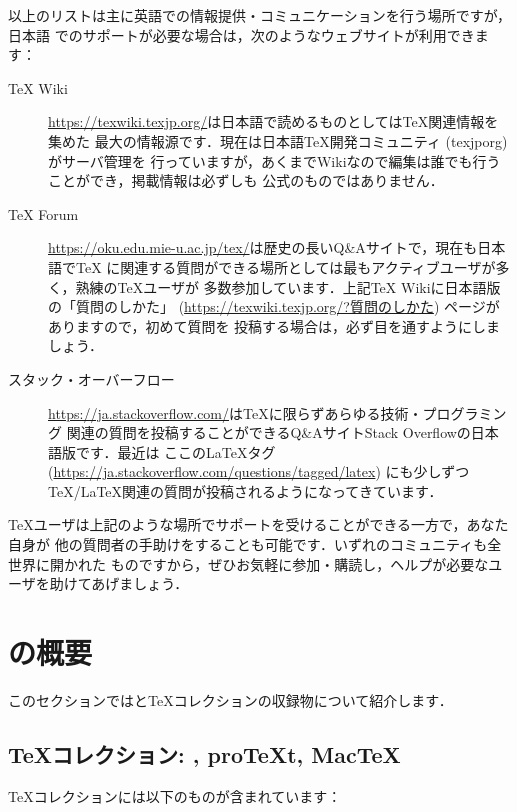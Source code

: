 \documentclass[uplatex,dvipdfmx]{jsarticle}
\begin{document}
%
以上のリストは主に英語での情報提供・コミュニケーションを行う場所ですが，日本語
でのサポートが必要な場合は，次のようなウェブサイトが利用できます：
%
\begin{description}
\item[{\TeX} Wiki]
\url{https://texwiki.texjp.org/}は日本語で読めるものとしては\TeX 関連情報を集めた
最大の情報源です．現在は日本語\TeX 開発コミュニティ (texjporg) がサーバ管理を
行っていますが，あくまでWikiなので編集は誰でも行うことができ，掲載情報は必ずしも
公式のものではありません．

\item[{\TeX} Forum]
\url{https://oku.edu.mie-u.ac.jp/tex/}は歴史の長いQ\&Aサイトで，現在も日本語で\TeX
に関連する質問ができる場所としては最もアクティブユーザが多く，熟練の\TeX ユーザが
多数参加しています．上記{\TeX} Wikiに日本語版の「質問のしかた」
(\url{https://texwiki.texjp.org/?質問のしかた}) ページがありますので，初めて質問を
投稿する場合は，必ず目を通すようにしましょう．

\item[スタック・オーバーフロー]
\url{https://ja.stackoverflow.com/}は\TeX に限らずあらゆる技術・プログラミング
関連の質問を投稿することができるQ\&AサイトStack Overflowの日本語版です．最近は
ここの\LaTeX タグ (\url{https://ja.stackoverflow.com/questions/tagged/latex})
にも少しずつ\TeX/\LaTeX 関連の質問が投稿されるようになってきています．
\end{description}

\TeX ユーザは上記のような場所でサポートを受けることができる一方で，あなた自身が
他の質問者の手助けをすることも可能です．いずれのコミュニティも全世界に開かれた
ものですから，ぜひお気軽に参加・購読し，ヘルプが必要なユーザを助けてあげましょう．

\section{\TL の概要}
\label{sec:overview-tl}

このセクションでは\TL と\TeX コレクションの収録物について紹介します．

\subsection{\TeX コレクション: \TL, pro\TeX{}t, Mac\TeX}
\label{sec:tl-coll-dists}

\TeX コレクション\DVD には以下のものが含まれています：
\end{document}
